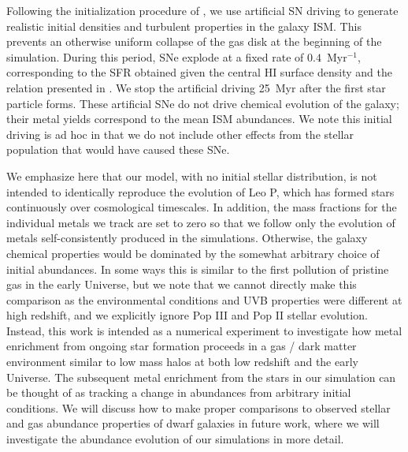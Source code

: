 Following the initialization procedure of \citet{Hu2017}, we use artificial SN driving to generate realistic initial densities and turbulent properties in the galaxy ISM. This prevents an otherwise uniform collapse of the gas disk at the beginning of the simulation. During this period, SNe explode at a fixed rate of $0.4$~Myr$^{-1}$, corresponding to the SFR obtained given the central HI surface density and the relation presented in \citep{Roychowdhury2009}. We stop the artificial driving 25~Myr after the first star particle forms. These artificial SNe do not drive chemical evolution of the galaxy; their metal yields correspond to the mean ISM abundances. We note this initial driving is ad hoc in that we do not include other effects from the stellar population that would have caused these SNe.

We emphasize here that our model, with no initial stellar distribution, is not intended to identically reproduce the evolution of Leo P, which has formed stars continuously over cosmological timescales. In addition, the mass fractions for the individual metals we track are set to zero so that we follow only the evolution of metals self-consistently produced in the simulations. Otherwise, the galaxy chemical properties would be dominated by the somewhat arbitrary choice of initial abundances. In some ways this is similar to the first pollution of pristine gas in the early Universe, but we note that we cannot directly make this comparison as the environmental conditions and UVB properties were different at high redshift, and we explicitly ignore Pop III and Pop II stellar evolution. Instead, this work is intended as a numerical experiment to investigate how metal enrichment from ongoing star formation proceeds in a gas / dark matter environment similar to low mass halos at both low redshift and the early Universe. The subsequent metal enrichment from the stars in our simulation can be thought of as tracking a change in abundances from arbitrary initial conditions. We will discuss how to make proper comparisons to observed stellar and gas abundance properties of dwarf galaxies in future work, where we will investigate the abundance evolution of our simulations in more detail.

